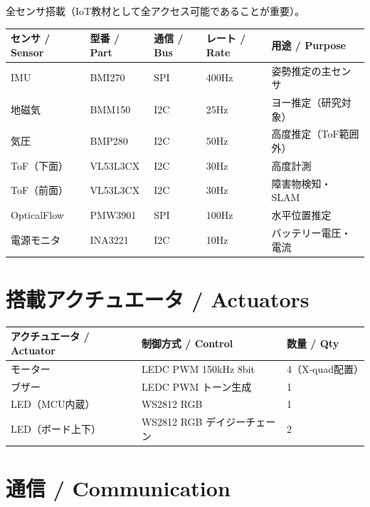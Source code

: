 \documentclass[a4paper,11pt]{article}
\newcommand{\thead}[1]{\textbf{\color{accentdark}#1}}
\begin{document}
全センサ搭載（IoT教材として全アクセス可能であることが重要）。

\begin{table}[h]
\centering
\begin{tabular}{@{}lllll@{}}
\toprule
\thead{センサ / Sensor} & \thead{型番 / Part} & \thead{通信 / Bus} & \thead{レート / Rate} & \thead{用途 / Purpose} \\
\midrule
IMU & BMI270 & SPI & 400Hz & 姿勢推定の主センサ \\
地磁気 & BMM150 & I2C & 25Hz & ヨー推定（研究対象） \\
気圧 & BMP280 & I2C & 50Hz & 高度推定（ToF範囲外） \\
ToF（下面） & VL53L3CX & I2C & 30Hz & 高度計測 \\
ToF（前面） & VL53L3CX & I2C & 30Hz & 障害物検知・SLAM \\
OpticalFlow & PMW3901 & SPI & 100Hz & 水平位置推定 \\
電源モニタ & INA3221 & I2C & 10Hz & バッテリー電圧・電流 \\
\bottomrule
\end{tabular}
\end{table}

\section{搭載アクチュエータ / Actuators}

\begin{table}[h]
\centering
\begin{tabular}{@{}lll@{}}
\toprule
\thead{アクチュエータ / Actuator} & \thead{制御方式 / Control} & \thead{数量 / Qty} \\
\midrule
モーター & LEDC PWM 150kHz 8bit & 4（X-quad配置） \\
ブザー & LEDC PWM トーン生成 & 1 \\
LED（MCU内蔵） & WS2812 RGB & 1 \\
LED（ボード上下） & WS2812 RGB デイジーチェーン & 2 \\
\bottomrule
\end{tabular}
\end{table}

\section{通信 / Communication}
\end{document}
